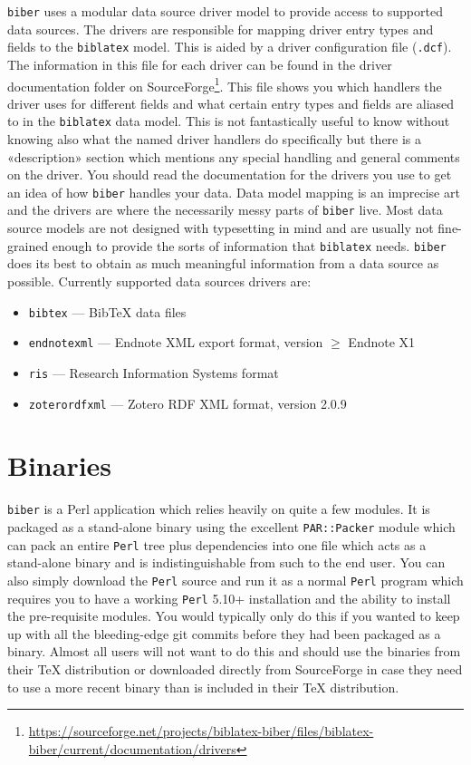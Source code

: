 \documentclass{ltxdockit}
\begin{document}
\verb+biber+ uses a modular data source driver model to provide access
to supported data sources. The drivers are responsible for mapping
driver entry types and fields to the \verb+biblatex+ model. This is
aided by a driver configuration file (\verb+.dcf+). The information in
this file for each driver can be found in the driver documentation folder on
SourceForge\footnote{\url{https://sourceforge.net/projects/biblatex-biber/files/biblatex-biber/current/documentation/drivers}}. This
file shows you which handlers the driver uses for different fields and
what certain entry types and fields are aliased to in the
\verb+biblatex+ data model. This is not fantastically useful to know
without knowing also what the named driver handlers do specifically but there
is a «description» section which mentions any special handling and
general comments on the driver. You should read the documentation for
the drivers you use to get an idea of how \verb+biber+ handles your
data. Data model mapping is an imprecise art
and the drivers are where the necessarily messy parts of \verb+biber+
live. Most data source models are not designed with typesetting in
mind and are usually not fine-grained enough to provide the sorts of
information that \verb+biblatex+ needs. \verb+biber+ does its best to
obtain as much meaningful information from a data source as possible.
Currently supported data sources drivers are:

\begin{itemize}
\item \verb+bibtex+ --- BibTeX data files
\item \verb+endnotexml+ --- Endnote XML export format, version $\geq$ Endnote X1
\item \verb+ris+ --- Research Information Systems format
\item \verb+zoterordfxml+ --- Zotero RDF XML format, version 2.0.9
\end{itemize}

\section{Binaries}\label{binaries}

\verb+biber+ is a Perl application which relies heavily on quite a few
modules. It is packaged as a stand-alone binary using the excellent
\verb+PAR::Packer+ module which can pack an entire \verb+Perl+ tree plus
dependencies into one file which acts as a stand-alone binary and is
indistinguishable from such to the end user. You can also simply download
the \verb+Perl+ source and run it as a normal \verb+Perl+ program which
requires you to have a working \verb+Perl+ 5.10+ installation and the
ability to install the pre-requisite modules. You would typically only do
this if you wanted to keep up with all the bleeding-edge git commits before
they had been packaged as a binary. Almost all users will not want to do
this and should use the binaries from their TeX distribution or downloaded
directly from SourceForge in case they need to use a more recent binary
than is included in their TeX distribution.
\end{document}

